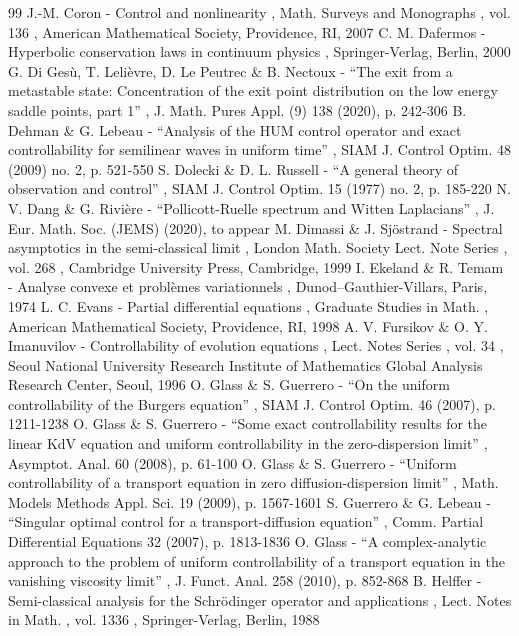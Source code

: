 \begin{thebibliography}{99}
 J.-M. Coron - Control and nonlinearity , Math. Surveys and Monographs , vol. 136 , American Mathematical Society, Providence, RI, 2007
 C. M. Dafermos - Hyperbolic conservation laws in continuum physics , Springer-Verlag, Berlin, 2000
 G. Di Gesù, T. Lelièvre, D. Le Peutrec \& B. Nectoux - “The exit from a metastable state: Concentration of the exit point distribution on the low energy saddle points, part 1” , J. Math. Pures Appl. (9) 138 (2020), p. 242-306
 B. Dehman \& G. Lebeau - “Analysis of the HUM control operator and exact controllability for semilinear waves in uniform time” , SIAM J. Control Optim. 48 (2009) no. 2, p. 521-550
 S. Dolecki \& D. L. Russell - “A general theory of observation and control” , SIAM J. Control Optim. 15 (1977) no. 2, p. 185-220
 N. V. Dang \& G. Rivière - “Pollicott-Ruelle spectrum and Witten Laplacians” , J. Eur. Math. Soc. (JEMS) (2020), to appear
 M. Dimassi \& J. Sjöstrand - Spectral asymptotics in the semi-classical limit , London Math. Society Lect. Note Series , vol. 268 , Cambridge University Press, Cambridge, 1999
 I. Ekeland \& R. Temam - Analyse convexe et problèmes variationnels , Dunod–Gauthier-Villars, Paris, 1974
 L. C. Evans - Partial differential equations , Graduate Studies in Math. , American Mathematical Society, Providence, RI, 1998
 A. V. Fursikov \& O. Y. Imanuvilov - Controllability of evolution equations , Lect. Notes Series , vol. 34 , Seoul National University Research Institute of Mathematics Global Analysis Research Center, Seoul, 1996
 O. Glass \& S. Guerrero - “On the uniform controllability of the Burgers equation” , SIAM J. Control Optim. 46 (2007), p. 1211-1238
 O. Glass \& S. Guerrero - “Some exact controllability results for the linear KdV equation and uniform controllability in the zero-dispersion limit” , Asymptot. Anal. 60 (2008), p. 61-100
 O. Glass \& S. Guerrero - “Uniform controllability of a transport equation in zero diffusion-dispersion limit” , Math. Models Methods Appl. Sci. 19 (2009), p. 1567-1601
 S. Guerrero \& G. Lebeau - “Singular optimal control for a transport-diffusion equation” , Comm. Partial Differential Equations 32 (2007), p. 1813-1836
 O. Glass - “A complex-analytic approach to the problem of uniform controllability of a transport equation in the vanishing viscosity limit” , J. Funct. Anal. 258 (2010), p. 852-868
 B. Helffer - Semi-classical analysis for the Schrödinger operator and applications , Lect. Notes in Math. , vol. 1336 , Springer-Verlag, Berlin, 1988

\end{thebibliography}
